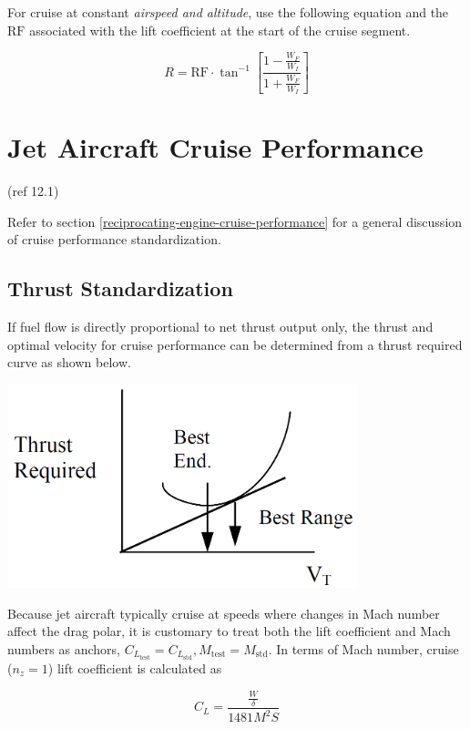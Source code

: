 \documentclass[
]{book}
\begin{document}
For cruise at constant \emph{airspeed and altitude}, use the following equation and
the \(\mathrm{RF}\) associated with the lift coefficient at the start of the
cruise segment.

\[
R = \mathrm{RF} \cdot \tan^{-1} \left[ \frac{1 - \frac{W_F}{W_I}}{1 + \frac{W_F}{W_I}} \right]
\label{eq:const-as-alt-rng}
\]

\hypertarget{jet-aircraft-cruise-performance}{%
\section{Jet Aircraft Cruise Performance}\label{jet-aircraft-cruise-performance}}

(ref 12.1)

Refer to section \ref{reciprocating-engine-cruise-performance} for a general
discussion of cruise performance standardization.

\hypertarget{thrust-standardization}{%
\subsection{Thrust Standardization}\label{thrust-standardization}}

If fuel flow is directly proportional to net thrust output only, the thrust and
optimal velocity for cruise performance can be determined from a thrust required
curve as shown below.

\includegraphics[width=4in,height=\textheight]{media/12/thrust-speed-curve.png}

Because jet aircraft typically cruise at speeds where changes in Mach number
affect the drag polar, it is customary to treat both the lift coefficient and
Mach numbers as anchors, \(C_{L_{\text{test}}} = C_{L_{\text{std}}}, M_{\text{test}} = M_{\text{std}}\).
In terms of Mach number, cruise (\(n_z = 1\)) lift coefficient is calculated as

\[
C_L = \frac{ \frac{W}{\delta} }{1481 M^2 S}
\label{eq:cruise-cl-in-mach}
\]
\end{document}
